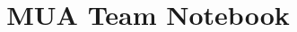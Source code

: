 \documentclass[9pt, a4paper, landscape]{article}
\title{\vspace{-4ex}\Large{MUA Team Notebook}}
\author{}
\date{}
\begin{document}
\begin{multicols}{2}

\maketitle
\vspace{-13ex}
\tableofcontents
\pagestyle{fancy}




\end{multicols}
\end{document}
